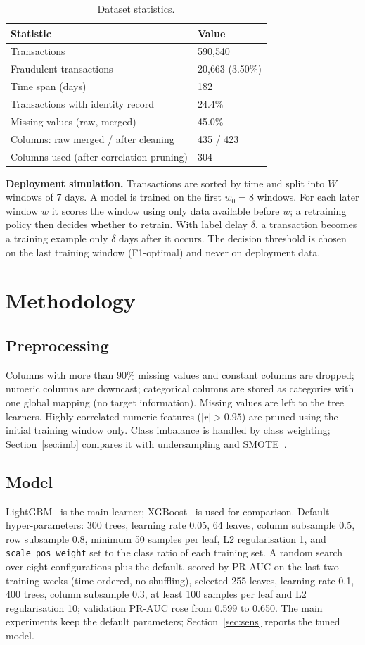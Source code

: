 \documentclass[conference]{IEEEtran}
\begin{document}
\begin{table}[t]\centering\caption{Dataset statistics.}\label{tab:data}
\begin{tabular}{ll}\toprule Statistic & Value\\\midrule
Transactions & 590{,}540\\ Fraudulent transactions & 20{,}663 (3.50\%)\\ Time span (days) & 182\\
Transactions with identity record & 24.4\%\\ Missing values (raw, merged) & 45.0\%\\
Columns: raw merged / after cleaning & 435 / 423\\ Columns used (after correlation pruning) & 304\\ \bottomrule\end{tabular}
\end{table}

\textbf{Deployment simulation.} Transactions are sorted by time and split into $W$ windows of 7 days. A model is trained on the first
$w_0=8$ windows. For each later window $w$ it scores the window using only data available before $w$; a retraining policy
then decides whether to retrain. With label delay $\delta$, a transaction becomes a training example only $\delta$ days after it occurs.
The decision threshold is chosen on the last training window (F1-optimal) and never on deployment data.

\section{Methodology}
\subsection{Preprocessing}
Columns with more than 90\% missing values and constant columns are dropped; numeric columns are downcast; categorical columns are
stored as categories with one global mapping (no target information). Missing values are left to the tree learners.
Highly correlated numeric features ($|r|>0.95$) are pruned using the initial training window only. Class imbalance is handled by
class weighting; Section~\ref{sec:imb} compares it with undersampling and SMOTE~\cite{chawla2002smote}.
\subsection{Model}
LightGBM~\cite{ke2017lightgbm} is the main learner; XGBoost~\cite{chen2016xgboost} is used for comparison. Default hyper-parameters: 300 trees, learning rate 0.05, 64 leaves, column subsample 0.5, row subsample 0.8,
minimum 50 samples per leaf, L2 regularisation 1, and \texttt{scale\_pos\_weight} set to the class ratio of each training set.
A random search over eight configurations plus the default, scored by PR-AUC on the last two training weeks (time-ordered, no shuffling), selected 255 leaves, learning rate 0.1, 400 trees, column subsample 0.3, at least 100 samples per leaf and L2 regularisation 10; validation PR-AUC rose from 0.599 to 0.650. The main experiments keep the default parameters; Section~\ref{sec:sens} reports the tuned model.
\end{document}
